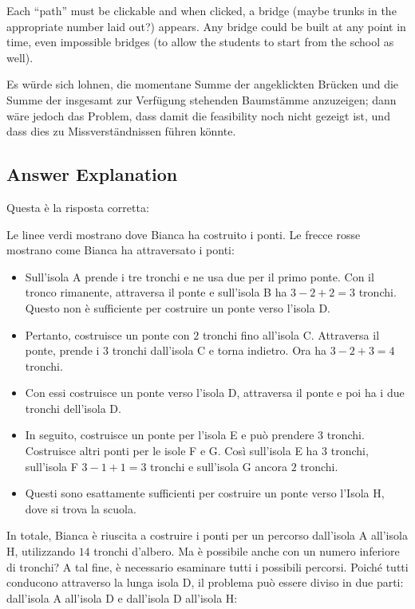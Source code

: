 \documentclass[a4paper,11pt]{report}
\newcommand{\taskGraphicsFolder}{..}
\begin{document}
Each \enquote{path} must be clickable and when clicked, a bridge (maybe trunks in the appropriate number laid out?) appears. Any bridge could be built at any point in time, even impossible bridges (to allow the students to start from the school as well).

Es würde sich lohnen, die momentane Summe der angeklickten Brücken und die Summe der insgesamt zur Verfügung stehenden Baumstämme anzuzeigen; dann wäre jedoch das Problem, dass damit die feasibility noch nicht gezeigt ist, und dass dies zu Missverständnissen führen könnte.

\endgroup

\subsection*{Answer Explanation}

Questa è la risposta corretta:

{\centering%
\par}

Le linee verdi mostrano dove Bianca ha costruito i ponti. Le frecce rosse mostrano come Bianca ha attraversato i ponti:

\begin{itemize}
  \item Sull’isola A prende i tre tronchi e ne usa due per il primo ponte. Con il tronco rimanente, attraversa il ponte e sull’isola B ha ${3 - 2 + 2 = 3}$ tronchi.  Questo non è sufficiente per costruire un ponte verso l’isola D.
  \item Pertanto, costruisce un ponte con $2$ tronchi fino all’isola C. Attraversa il ponte, prende i $3$ tronchi dall’isola C e torna indietro.  Ora ha ${3 - 2 + 3 = 4}$ tronchi.
  \item Con essi costruisce un ponte verso l’isola D, attraversa il ponte e poi ha i due tronchi dell’isola D.
  \item In seguito, costruisce un ponte per l’isola E e può prendere $3$ tronchi. Costruisce altri ponti per le isole F e G. Così sull’isola E ha $3$ tronchi, sull’isola F ${3 - 1 + 1 = 3}$ tronchi e sull’isola G ancora $2$ tronchi.
  \item Questi sono esattamente sufficienti per costruire un ponte verso l’Isola H, dove si trova la scuola.
\end{itemize}

In totale, Bianca è riuscita a costruire i ponti per un percorso dall’isola A all’isola H, utilizzando $14$ tronchi d’albero.  Ma è possibile anche con un numero inferiore di tronchi? A tal fine, è necessario esaminare tutti i possibili percorsi. Poiché tutti conducono attraverso la lunga isola D, il problema può essere diviso in due parti: dall’isola A all’isola D e dall’isola D all’isola H:
\end{document}
